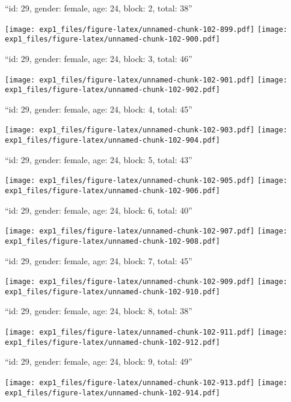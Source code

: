 \documentclass[11pt,,]{article}
\begin{document}
\newpage
[1] 

``id: 29, gender: female, age: 24, block: 2, total: 38''

\texttt{[image: exp1\_files/figure-latex/unnamed-chunk-102-899.pdf]}
\texttt{[image: exp1\_files/figure-latex/unnamed-chunk-102-900.pdf]}

\newpage
[1] 

``id: 29, gender: female, age: 24, block: 3, total: 46''

\texttt{[image: exp1\_files/figure-latex/unnamed-chunk-102-901.pdf]}
\texttt{[image: exp1\_files/figure-latex/unnamed-chunk-102-902.pdf]}

\newpage
[1] 

``id: 29, gender: female, age: 24, block: 4, total: 45''

\texttt{[image: exp1\_files/figure-latex/unnamed-chunk-102-903.pdf]}
\texttt{[image: exp1\_files/figure-latex/unnamed-chunk-102-904.pdf]}

\newpage
[1] 

``id: 29, gender: female, age: 24, block: 5, total: 43''

\texttt{[image: exp1\_files/figure-latex/unnamed-chunk-102-905.pdf]}
\texttt{[image: exp1\_files/figure-latex/unnamed-chunk-102-906.pdf]}

\newpage
[1] 

``id: 29, gender: female, age: 24, block: 6, total: 40''

\texttt{[image: exp1\_files/figure-latex/unnamed-chunk-102-907.pdf]}
\texttt{[image: exp1\_files/figure-latex/unnamed-chunk-102-908.pdf]}

\newpage
[1] 

``id: 29, gender: female, age: 24, block: 7, total: 45''

\texttt{[image: exp1\_files/figure-latex/unnamed-chunk-102-909.pdf]}
\texttt{[image: exp1\_files/figure-latex/unnamed-chunk-102-910.pdf]}

\newpage
[1] 

``id: 29, gender: female, age: 24, block: 8, total: 38''

\texttt{[image: exp1\_files/figure-latex/unnamed-chunk-102-911.pdf]}
\texttt{[image: exp1\_files/figure-latex/unnamed-chunk-102-912.pdf]}

\newpage
[1] 

``id: 29, gender: female, age: 24, block: 9, total: 49''

\texttt{[image: exp1\_files/figure-latex/unnamed-chunk-102-913.pdf]}
\texttt{[image: exp1\_files/figure-latex/unnamed-chunk-102-914.pdf]}
\end{document}
